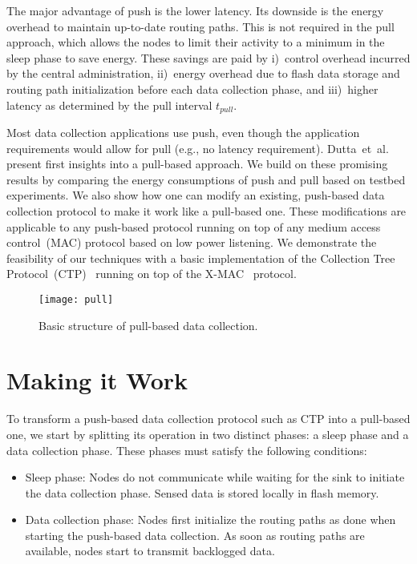 \documentclass[10pt]{sensys-abstract}
\newcommand{\etal}{et~al.\xspace}
\newcommand{\eg}{e.g.,\xspace}
\begin{document}
The major advantage of push is the lower latency. Its downside is the energy overhead to maintain up-to-date routing paths. This is not required in the pull approach, which allows the nodes to limit their activity to a minimum in the sleep phase to save energy. These savings are paid by i)~control overhead incurred by the central administration, ii)~energy overhead due to flash data storage and routing path initialization before each data collection phase, and iii)~higher latency as determined by the pull interval $t_{pull}$.

Most data collection applications use push, even though the application requirements would allow for pull (\eg no latency requirement). Dutta~\etal~\cite{Dutta2007} present first insights into a pull-based approach. We build on these promising results by comparing the energy consumptions of push and pull based on testbed experiments. We also show how one can modify an existing, push-based data collection protocol to make it work like a pull-based one. These modifications are applicable to any push-based protocol running on top of any medium access control~(MAC) protocol based on low power listening. We demonstrate the feasibility of our techniques with a basic implementation of the Collection Tree Protocol~(CTP)~\cite{Gnawali2009b} running on top of the X-MAC~\cite{Buettner2006} protocol.

\begin{figure}
 \centering
 \texttt{[image: pull]}
 \caption{Basic structure of pull-based data collection.}
 \label{fig:pull}
\end{figure}

\section{Making it Work}\label{sec:approach}

To transform a push-based data collection protocol such as CTP into a pull-based one, we start by splitting its operation in two distinct phases: a sleep phase and a data collection phase. These phases must satisfy the following conditions:
\begin{itemize}
 \item Sleep phase: Nodes do not communicate while waiting for the sink to initiate the data collection phase. Sensed data is stored locally in flash memory.
 \item Data collection phase: Nodes first initialize the routing paths as done when starting the push-based data collection. As soon as routing paths are available, nodes start to transmit backlogged data.
\end{itemize}
\end{document}
